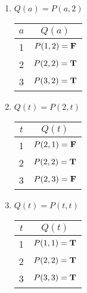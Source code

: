 \begin{solutions}
			\begin{enumerate}
			\item $Q(a) = P(a,2)$
				
						\begin{table}[h!]
						\begin{center}
							\begin{tabular}{c|c}
								
								$a$ & $Q(a)$ \\
								\hline
								1 & $P(1,2) = \textbf{\textrm{F}}$ \\ 
								2 & $P(2,2) = \textbf{\textrm{T}}$ \\
								3 & $P(3,2) = \textbf{\textrm{T}}$ \\
							\end{tabular}
						\end{center}
					\end{table}
			\item $Q(t) = P(2,t)$
			
									\begin{table}[h!]
				\begin{center}
					\begin{tabular}{c|c}
						
						$t$ & $Q(t)$ \\
						\hline
						1 & $P(2,1) = \textbf{\textrm{F}}$ \\ 
						2 & $P(2,2) = \textbf{\textrm{T}}$ \\
						3 & $P(2,3) = \textbf{\textrm{F}}$ \\
					\end{tabular}
				\end{center}
			\end{table}
		
			\item $Q(t) = P(t,t)$
			
									\begin{table}[h!]
				\begin{center}
					\begin{tabular}{c|c}
						
						$t$ & $Q(t)$ \\
						\hline
						1 & $P(1,1) = \textbf{\textrm{T}}$ \\ 
						2 & $P(2,2) = \textbf{\textrm{T}}$ \\
						3 & $P(3,3) = \textbf{\textrm{T}}$ \\
					\end{tabular}
				\end{center}
			\end{table}
		

\end{enumerate}
\end{solutions}
